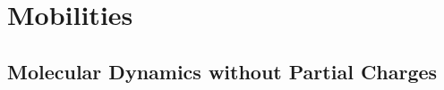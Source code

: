 \section{Mobilities}



\clearpage
\subsection{Molecular Dynamics without Partial Charges}


\label{sect:partial_charge_importance}

